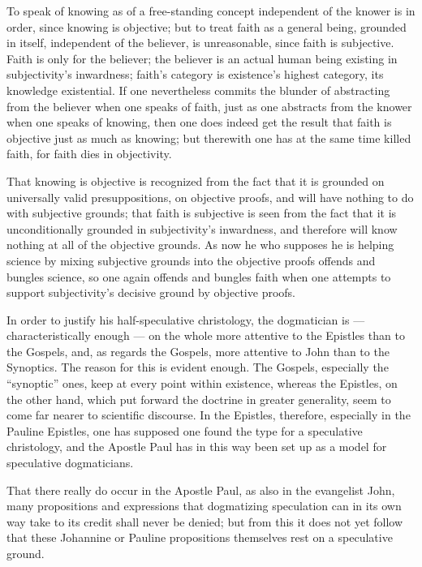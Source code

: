 \documentclass[12pt,a4paper]{book}
\begin{document}
To speak of knowing as of a free-standing concept independent of the knower is in order, since
knowing is objective; but to treat faith as a general being, grounded in itself, independent of
the believer, is unreasonable, since faith is subjective. Faith is only for the believer; the
believer is an actual human being existing in subjectivity's inwardness; faith's category is
existence's highest category, its knowledge existential. If one nevertheless commits the
blunder of abstracting from the believer when one speaks of faith, just as one abstracts from
the knower when one speaks of knowing, then one does indeed get the result that faith is
objective just as much as knowing; but therewith one has at the same time killed faith, for
faith dies in objectivity.

That knowing is objective is recognized from the fact that it is grounded on universally valid
presuppositions, on objective proofs, and will have nothing to do with subjective grounds; that
faith is subjective is seen from the fact that it is unconditionally grounded in subjectivity's
inwardness, and therefore will know nothing at all of the objective grounds. As now he who
supposes he is helping science by mixing subjective grounds into the objective proofs offends
and bungles science, so one again offends and bungles faith when one attempts to support
subjectivity's decisive ground by objective proofs.

In order to justify his half-speculative christology, the dogmatician is --- characteristically
enough --- on the whole more attentive to the Epistles than to the Gospels, and, as regards the
Gospels, more attentive to John than to the Synoptics. The reason for this is evident enough.
The Gospels, especially the ``synoptic'' ones, keep at every point within existence, whereas
the Epistles, on the other hand, which put forward the doctrine in greater generality, seem to
come far nearer to scientific discourse. In the Epistles, therefore, especially in the Pauline
Epistles, one has supposed one found the type for a speculative christology, and the Apostle
Paul has in this way been set up as a model for speculative dogmaticians.

That there really do occur in the Apostle Paul, as also in the evangelist John, many
propositions and expressions that dogmatizing speculation can in its own way take to its
credit shall never be denied; but from this it does not yet follow that these Johannine or
Pauline propositions themselves rest on a speculative ground.
\end{document}
